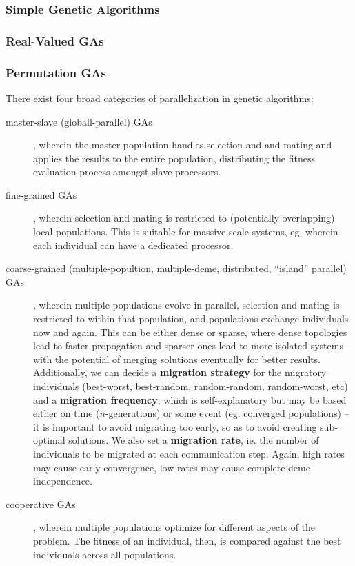 \documentclass[12pt]{article}
\begin{document}
\subsubsection{Simple Genetic Algorithms}


\subsubsection{Real-Valued GAs}

\subsubsection{Permutation GAs}


There exist four broad categories of parallelization in genetic algorithms:
\begin{description}
\item[master-slave (globall-parallel) GAs], wherein the master population handles selection and and mating and applies the results to the entire population, distributing the fitness evaluation process amongst slave processors.
\item[fine-grained GAs], wherein selection and mating is restricted to (potentially overlapping) local populations. This is suitable for massive-scale systems, eg. wherein each individual can have a dedicated processor.
\item[coarse-grained (multiple-popultion, multiple-deme, distributed, ``island'' parallel) GAs], wherein multiple populations evolve in parallel, selection and mating is restricted to within that population, and populations exchange individuals now and again. This can be either dense or sparse, where dense topologies lead to faster propogation and sparser ones lead to more isolated systems with the potential of merging solutions eventually for better results. Additionally, we can decide a {\bf migration strategy} for the migratory individuals (best-worst, best-random, random-random, random-worst, etc) and a {\bf migration frequency}, which is self-explanatory but may be based either on time ($n$-generations) or some event (eg. converged populations) -- it is important to avoid migrating too early, so as to avoid creating sub-optimal solutions. We also set a {\bf migration rate}, ie. the number of individuals to be migrated at each communication step. Again, high rates may cause early convergence, low rates may cause complete deme independence.
\item[cooperative GAs], wherein multiple populations optimize for different aspects of the problem. The fitness of an individual, then, is compared against the best individuals across all populations.
\end{description}
\end{document}
